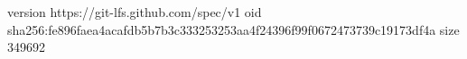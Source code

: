 version https://git-lfs.github.com/spec/v1
oid sha256:fe896faea4acafdb5b7b3c333253253aa4f24396f99f0672473739c19173df4a
size 349692

